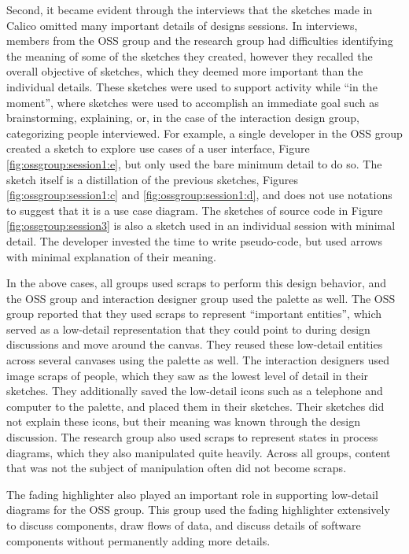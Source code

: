 Second, it became evident through the interviews that the sketches made in Calico omitted many important details of designs sessions. In interviews, members from the OSS group and the research group had difficulties identifying the meaning of some of the sketches they created, however they recalled the overall objective of sketches, which they deemed more important than the individual details. These sketches were used to support activity while ``in the moment'', where sketches were used to accomplish an immediate goal such as brainstorming, explaining, or, in the case of the interaction design group, categorizing people interviewed. For example, a single developer in the OSS group created a sketch to explore use cases of a user interface, Figure \ref{fig:ossgroup:session1:e}, but only used the bare minimum detail to do so. The sketch itself is a distillation of the previous sketches, Figures \ref{fig:ossgroup:session1:c} and \ref{fig:ossgroup:session1:d}, and does not use notations to suggest that it is a use case diagram. The sketches of source code in Figure \ref{fig:ossgroup:session3} is also a sketch used in an individual session with minimal detail. The developer invested the time to write pseudo-code, but used arrows with minimal explanation of their meaning. 

In the above cases, all groups used scraps to perform this design behavior, and the OSS group and interaction designer group used the palette as well. The OSS group reported that they used scraps to represent ``important entities'', which served as a low-detail representation that they could point to during design discussions and move around the canvas. They reused these low-detail entities across several canvases using the palette as well. The interaction designers used image scraps of people, which they saw as the lowest level of detail in their sketches. They additionally saved the low-detail icons such as a telephone and computer to the palette, and placed them in their sketches. Their sketches did not explain these icons, but their meaning was known through the design discussion. The research group also used scraps to represent states in process diagrams, which they also manipulated quite heavily. Across all groups, content that was not the subject of manipulation often did not become scraps.

The fading highlighter also played an important role in supporting low-detail diagrams for the OSS group. This group used the fading highlighter extensively to discuss components, draw flows of data, and discuss details of software components without permanently adding more details.

